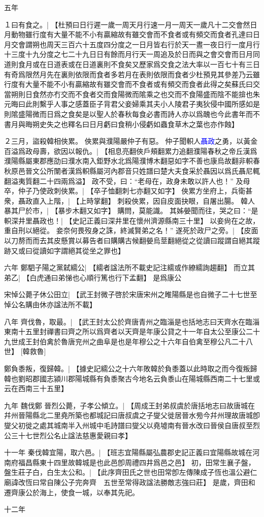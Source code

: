 	五年

１曰有食之。|{
	【杜預曰日行遲一歲一周天月行速一月一周天一歲凡十二交會然日月動物雖行度有大量不能不小有贏縮故有雖交會而不食者或有頻交而食者孔達曰日月交會謂朔也周天三百六十五度四分度之一日月皆右行於天一晝一夜日行一度月行十三度十九分度之七二十九日日有餘而月行天一周追及於日而與之會交會而日月同道則食月或在日道表或在日道裏則不食矣又歷家爲交食之法大率以一百七十有三日有奇爲限然月先在裏則依限而食者多若月在表則依限而食者少杜預見其參差乃云雖行度有大量不能不小有贏縮故有雖交會而不食者或有頻交而食者此得之矣蘇氏曰交當朔則日食然亦冇交而不食者交而食陽微而隂乘之也交而不食陽盛而陰不能揜也朱元晦曰此則繫乎人事之感蓋臣子背君父妾婦乘其夫小人陵君子夷狄侵中國所感如是則隂盛陽微而日爲之食矣是以聖人於春秋每食必書而詩人亦以爲醜也今此書年而不書月與晦朔史失之也釋名曰日月虧曰食稍小侵虧如蟲食草木之葉也亦作蝕】
	}

２三月，盜殺韓相俠累。
俠累與濮陽嚴仲子有惡。
仲子聞軹人\textcolor{blue}{聶政}之勇，以黃金百溢爲政母壽，欲因以報仇。|{
	【相息亮翻俠戶頰翻累力追翻濮陽春秋之帝丘漢爲濮陽縣屬東郡應劭曰濮水南入鉅野水北爲陽濮博木翻惡如字不善也康烏故翻非軹春秋原邑晉文公所闈者漢爲軹縣屬河內郡音只姓譜曰楚大夫食采於聶因以爲氏聶尼輒翻溢夷質翻二十四兩爲溢】
	}
政不受，曰：“老母在，政身未敢以許人也！”
及母卒，仲子乃使政刺俠累。|{
	【卒子恤翻刺七亦翻又如字】}
俠累方坐府上，兵衛甚衆，聶政直入上階，|{
	【上時掌翻】}
刺殺俠累，因自皮面抉眼，自屠出腸。
韓人暴其尸於市，|{
	【暴步木翻又如字】}
購問，莫能識。
其姊嫈聞而往，哭之曰：“是軹深井里聶政也！|{
	【史記正義曰深井里在懷州濟源縣南三十里】}
以妾尙在之故，重自刑以絕從。
妾奈何畏歿身之誅，終滅賢弟之名！”
遂死於政尸之旁。|{
	【皮面以刀剺而而去其皮懸賞以募告者曰購購古候翻嫈烏莖翻絕從之從讀曰蹤謂自絕其蹤跡又或曰從讀如字謂絕其從坐之罪也】
	}

	六年
鄭駟子陽之黨弑繻公|{
	【繻者諡法所不載史記注繻或作繚繻詢趨翻】}
而立其弟乙|{
	【白虎通曰弟悌也心順行篤也行下孟翻】}
是爲康公

宋悼公薨子休公田立|{
	【武王封微子啓於宋唐宋州之睢陽縣是也自微子二十七世至悼公名購由休亦諡法所不載】}
\par 八年
齊伐魯，取最。|{
	【武王封太公於齊唐青州之臨淄是也括地志曰天齊水在臨淄東南十五里封禪書曰齊之所以爲齊者以天齊是年康公貸之十一年自太公至康公二十九世成王封伯禽於魯唐兖州之曲阜是也是年穆公之十六年自伯禽至穆公凡二十八世】
	}
[韓救魯]

鄭負黍叛，復歸韓。|{
	【據史記繻公之十六年敗韓於負黍蓋以此時取之而今復叛歸韓也劉昭郡國志潁川郡陽城縣有負黍聚古今地名云負黍山在陽城縣西南二十七里或云在西南三十五里】}
\par 九年
魏伐鄭
晉烈公薨，子孝公傾立。|{
	【周成王封弟叔虞於唐括地志曰故唐城在幷州晉陽縣北二里堯所築也都城記曰唐叔虞之子燮父徙居晉水㫄今幷州理故唐城卽燮父初徙之處其城南半入州城中毛詩譜曰燮父以堯墟南有晉水改曰晉侯自唐叔至烈公三十七世烈公名止諡法慈惠愛親曰孝】}
\par 十一年
秦伐韓宜陽，取六邑。|{
	【班志宜陽縣屬弘農郡史記正義曰宜陽縣故城在河南府福昌縣東十四里故韓城是也此邑卽周禮四井爲邑之邑】}
初，田常生襄子盤，盤生莊子白，白生太公和。|{
	【此序齊田氏之世也田常卽左傳陳成子恆也溫公避仁廟諱改恆曰常自陳公子完奔齊　五世至常得政諡法勝敵志強曰莊】}
是歲，齊田和遷齊康公於海上，使食一城，以奉其先祀。
\par 十二年

